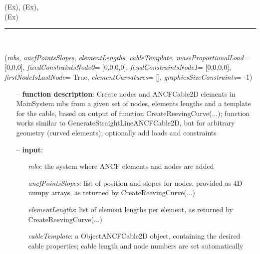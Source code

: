 \begin{itemize}[leftmargin=1.4cm]
\begin{itemize}[leftmargin=1.4cm]
\begin{itemize}[leftmargin=0.5cm]
\begin{itemize}[leftmargin=1.4cm]
 (Ex), 
 (Ex), 
\\  (Ex)\ei

%
\noindent\rule{8cm}{0.75pt}\vspace{1pt} \\ 
\begin{flushleft}
\label{sec:beams:PointsAndSlopes2ANCFCable2D}
({\it mbs}, {\it ancfPointsSlopes}, {\it elementLengths}, {\it cableTemplate}, {\it massProportionalLoad}= [0,0,0], {\it fixedConstraintsNode0}= [0,0,0,0], {\it fixedConstraintsNode1}= [0,0,0,0], {\it firstNodeIsLastNode}= True, {\it elementCurvatures}= [], {\it graphicsSizeConstraints}= -1)
\end{flushleft}
\setlength{\itemindent}{0.7cm}
\begin{itemize}[leftmargin=0.7cm]
  \item[--]  {\bf function description}: Create nodes and ANCFCable2D elements in MainSystem mbs from a given set of nodes, elements lengths and a template for the cable, based on output of function CreateReevingCurve(...); function works similar to GenerateStraightLineANCFCable2D, but for arbitrary geometry (curved elements); optionally add loads and constraints  \item[--]  {\bf input}: \vspace{-6pt}
  \begin{itemize}[leftmargin=1.2cm]
\setlength{\itemindent}{-0.7cm}
    \item[] {\it mbs}: the system where ANCF elements and nodes are added
    \item[] {\it   ancfPointsSlopes}: list of position and slopes for nodes, provided as 4D numpy arrays, as returned by CreateReevingCurve(...)
    \item[] {\it   elementLengths}: list of element lengths per element, as returned by CreateReevingCurve(...)
    \item[] {\it   cableTemplate}: a ObjectANCFCable2D object, containing the desired cable properties; cable length and node numbers are set automatically

\end{itemize}
\end{itemize}
\end{itemize}
\end{itemize}
\end{itemize}
\end{itemize}
